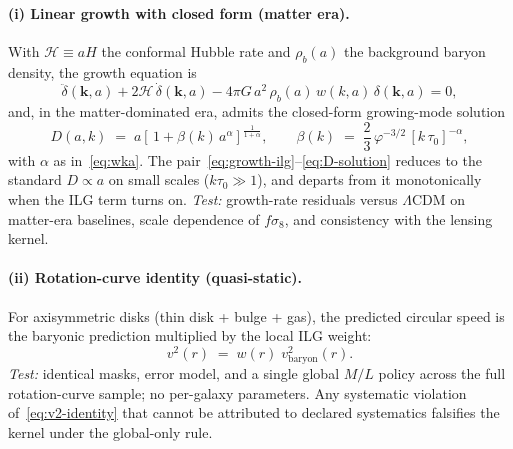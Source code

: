 \documentclass[11pt]{article}
\begin{document}
\paragraph{(i) Linear growth with closed form (matter era).}
With $\mathcal{H}\equiv aH$ the conformal Hubble rate and $\rho_b(a)$ the background baryon density, the growth equation is
\begin{equation}\label{eq:growth-ilg}
\ddot{\delta}(\mathbf{k},a)+2\mathcal{H}\,\dot{\delta}(\mathbf{k},a)-4\pi G\,a^2\,\rho_b(a)\,w(k,a)\,\delta(\mathbf{k},a)=0,
\end{equation}
and, in the matter-dominated era, admits the closed-form growing-mode solution
\begin{equation}\label{eq:D-solution}
D(a,k)\;=\;a\left[\,1+\beta(k)\,a^{\alpha}\right]^{\frac{1}{1+\alpha}},
\qquad \beta(k)\;=\;\frac{2}{3}\,\varphi^{-3/2}\,[k\,\tau_0]^{-\alpha},
\end{equation}
with $\alpha$ as in~\eqref{eq:wka}. The pair~\eqref{eq:growth-ilg}--\eqref{eq:D-solution} reduces to the standard $D\propto a$ on small scales ($k\tau_0\gg 1$), and departs from it monotonically when the ILG term turns on. \emph{Test:} growth-rate residuals versus $\Lambda$CDM on matter-era baselines, scale dependence of $f\sigma_8$, and consistency with the lensing kernel. 

\paragraph{(ii) Rotation-curve identity (quasi-static).}
For axisymmetric disks (thin disk + bulge + gas), the predicted circular speed is the baryonic prediction multiplied by the local ILG weight:
\begin{equation}\label{eq:v2-identity}
v^2(r)\;=\;w(r)\;v^2_{\mathrm{baryon}}(r).
\end{equation}
\emph{Test:} identical masks, error model, and a single global $M/L$ policy across the full rotation-curve sample; no per-galaxy parameters. Any systematic violation of~\eqref{eq:v2-identity} that cannot be attributed to declared systematics falsifies the kernel under the global-only rule. 
\end{document}
